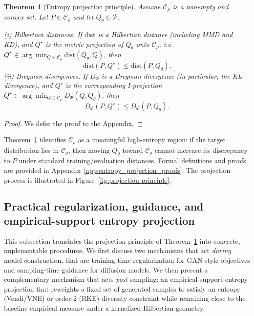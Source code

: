 \documentclass{article}
\newtheorem{theorem}{Theorem}
\theoremstyle{plain}
\theoremstyle{definition}
\begin{document}
\begin{theorem}[Entropy projection principle]\label{thm:entropy_projection_main}
Assume $\mathcal{C}_\rho$ is a nonempty and convex set.
Let $P\in \mathcal{C}_\rho$ and let $Q_\theta\in\mathcal{P}$.

\emph{(i) Hilbertian distances.}
If $\mathrm{dist}$ is a Hilbertian distance (including MMD and KD),
and $Q^\star$ is the metric projection of $Q_\theta$ onto $\mathcal{C}_\rho$, i.e.
$Q^\star\in\arg\min_{Q\in\mathcal{C}_\rho}\mathrm{dist}(Q_\theta,Q)$,
then
\begin{equation}\label{eq:hilbert_contract_main}
\mathrm{dist}(P,Q^\star)\le \mathrm{dist}(P,Q_\theta).
\end{equation}
\emph{(ii) Bregman divergences.}
If $D_\Phi$ is a Bregman divergence (in particular, the KL divergence),
and $Q^\star$ is the corresponding I-projection
$Q^\star\in\arg\min_{Q\in\mathcal{C}_\rho} D_\Phi(Q,Q_\theta)$,
then
\begin{equation}\label{eq:bregman_contract_main}
D_\Phi(P,Q^\star)\le D_\Phi(P,Q_\theta).
\end{equation}
\end{theorem}
\begin{proof}
    We defer the proof to the Appendix.
\end{proof}

Theorem~\ref{thm:entropy_projection_main} identifies $\mathcal{C}_\rho$ as a meaningful high-entropy region:
if the target distribution lies in $\mathcal{C}_\rho$, then moving $Q_\theta$ toward $\mathcal{C}_\rho$
cannot increase its discrepancy to $P$ under standard training/evaluation distances.
Formal definitions and proofs are provided in Appendix~\ref{app:entropy_projection_proofs}. The projection process is illustrated in Figure~\ref{fig:projection-principle}.



\subsection{Practical regularization, guidance, and empirical-support entropy projection}
\label{sec:practical_projection}

This subsection translates the projection principle of Theorem~\ref{thm:entropy_projection_main} into concrete, implementable procedures. We first discuss two mechanisms that act \emph{during} model construction, that are training-time regularization for GAN-style objectives and sampling-time guidance for diffusion models. We then present a complementary mechanism that acts \emph{post} sampling: an empirical-support entropy projection that reweights a fixed set of generated samples to satisfy an entropy (Vendi/VNE) or order-2 (RKE) diversity constraint while remaining close to the baseline empirical measure under a kernelized Hilbertian geometry.
\end{document}
